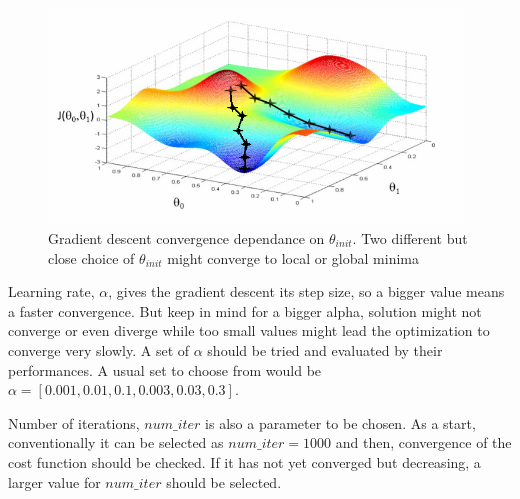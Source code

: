 \begin{figure}
\begin{center}
\includegraphics[width=11cm]{figures/localOrGlobalMinimaGD}    %
\caption{Gradient descent convergence dependance on $\theta_{init}$. Two different but close choice of $\theta_{init}$ might converge to local or global minima \cite{andrewNg_MachLearning}} 
\label{fig:localOrGlobalMinimaGD}
\end{center}
\end{figure}
 
Learning rate,  $\alpha$, gives the gradient descent its step size, so a bigger value means a faster convergence. 
But keep in mind for a bigger alpha, solution might not converge or even diverge while too small values might lead the optimization to converge very slowly.
A set of $\alpha$ should be tried and evaluated by their performances. A usual set to choose from would be $\alpha = [0.001, 0.01, 0.1, 0.003, 0.03, 0.3]$.
  
Number of iterations, $num\_iter$ is also a parameter to be chosen. 
As a start, conventionally it can be selected as $num\_iter = 1000$ and then, convergence of the cost function should be checked. 
If it has not yet converged but decreasing, a larger value for $num\_iter$ should be selected.


